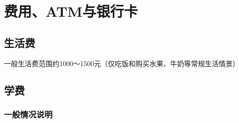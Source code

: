 \section[费用、ATM与银行卡]{费用、ATM与银行卡}

\subsection[生活费]{生活费}
一般生活费范围约1000～1500元（仅吃饭和购买水果、牛奶等常规生活情景）

\subsection[学费]{学费\footnotemark}
\subsubsection[一般情况说明]{一般情况说明}
